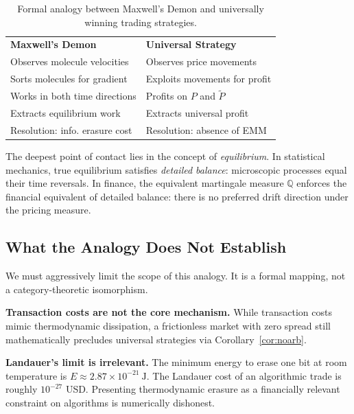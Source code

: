 \documentclass[aps,pra,reprint,superscriptaddress,amsmath,amssymb]{revtex4-2}
\theoremstyle{plain}
\theoremstyle{definition}
\theoremstyle{remark}
\begin{document}
\begin{table}[htbp]
\caption{\label{tab:demon}Formal analogy between Maxwell's Demon and universally winning trading strategies.}
\centering
\begin{ruledtabular}
\begin{tabular*}{\columnwidth}{@{\extracolsep{\fill}}ll}
\textbf{Maxwell's Demon} & \textbf{Universal Strategy} \\
\colrule
Observes molecule velocities & Observes price movements \\
Sorts molecules for gradient & Exploits movements for profit \\
Works in both time directions & Profits on $P$ and $\widetilde{P}$ \\
Extracts equilibrium work & Extracts universal profit \\
Resolution: info. erasure cost & Resolution: absence of EMM \\
\end{tabular*}
\end{ruledtabular}
\end{table}

The deepest point of contact lies in the concept of \emph{equilibrium}. In statistical mechanics, true equilibrium satisfies \emph{detailed balance}: microscopic processes equal their time reversals. In finance, the equivalent martingale measure $\mathbb{Q}$ enforces the financial equivalent of detailed balance: there is no preferred drift direction under the pricing measure.

\subsection{What the Analogy Does Not Establish}

We must aggressively limit the scope of this analogy. It is a formal mapping, not a category-theoretic isomorphism.

\textbf{Transaction costs are not the core mechanism.} While transaction costs mimic thermodynamic dissipation, a frictionless market with zero spread still mathematically precludes universal strategies via Corollary~\ref{cor:noarb}.

\textbf{Landauer's limit is irrelevant.} The minimum energy to erase one bit at room temperature is $E \approx 2.87\times 10^{-21}~\text{J}$. The Landauer cost of an algorithmic trade is roughly $10^{-27}$ USD. Presenting thermodynamic erasure as a financially relevant constraint on algorithms is numerically dishonest.
\end{document}
